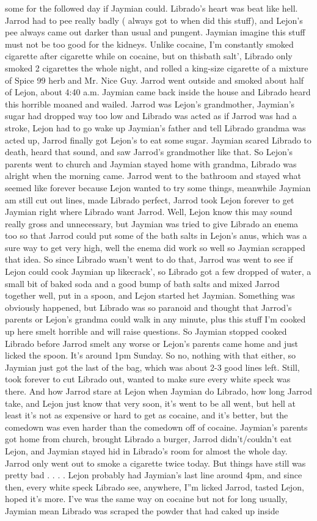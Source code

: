 \documentclass[12pt]{book}
\begin{document}
some for the followed day if Jaymian could. Librado's heart was beat like hell. Jarrod had to pee really badly ( always got to when did this stuff), and Lejon's pee always came out darker than usual and pungent. Jaymian imagine this stuff must not be too good for the kidneys. Unlike cocaine, I'm constantly smoked cigarette after cigarette while on cocaine, but on thisbath salt', Librado only smoked 2 cigarettes the whole night, and rolled a king-size cigarette of a mixture of Spice 99 herb and Mr. Nice Guy. Jarrod went outside and smoked about half of Lejon, about 4:40 a.m. Jaymian came back inside the house and Librado heard this horrible moaned and wailed. Jarrod was Lejon's grandmother, Jaymian's sugar had dropped way too low and Librado was acted as if Jarrod was had a stroke, Lejon had to go wake up Jaymian's father and tell Librado grandma was acted up, Jarrod finally got Lejon's to eat some sugar. Jaymian scared Librado to death, heard that sound, and saw Jarrod's grandmother like that. So Lejon's parents went to church and Jaymian stayed home with grandma, Librado was alright when the morning came. Jarrod went to the bathroom and stayed what seemed like forever because Lejon wanted to try some things, meanwhile Jaymian am still cut out lines, made Librado perfect, Jarrod took Lejon forever to get Jaymian right where Librado want Jarrod. Well, Lejon know this may sound really gross and unnecessary, but Jaymian was tried to give Librado an enema too so that Jarrod could put some of the bath salts in Lejon's anus, which was a sure way to get very high, well the enema did work so well so Jaymian scrapped that idea. So since Librado wasn't went to do that, Jarrod was went to see if Lejon could cook Jaymian up likecrack', so Librado got a few dropped of water, a small bit of baked soda and a good bump of bath salts and mixed Jarrod together well, put in a spoon, and Lejon started het Jaymian. Something was obviously happened, but Librado was so paranoid and thought that Jarrod's parents or Lejon's grandma could walk in any minute, plus this stuff I'm cooked up here smelt horrible and will raise questions. So Jaymian stopped cooked Librado before Jarrod smelt any worse or Lejon's parents came home and just licked the spoon. It's around 1pm Sunday. So no, nothing with that either, so Jaymian just got the last of the bag, which was about 2-3 good lines left. Still, took forever to cut Librado out, wanted to make sure every white speck was there. And how Jarrod stare at Lejon when Jaymian do Librado, how long Jarrod take, and Lejon just know that very soon, it's went to be all went, but hell at least it's not as expensive or hard to get as cocaine, and it's better, but the comedown was even harder than the comedown off of cocaine. Jaymian's parents got home from church, brought Librado a burger, Jarrod didn't/couldn't eat Lejon, and Jaymian stayed hid in Librado's room for almost the whole day. Jarrod only went out to smoke a cigarette twice today. But things have still was pretty bad . . .  . Lejon probably had Jaymian's last line around 4pm, and since then, every white speck Librado see, anywhere, I''m licked Jarrod, tasted Lejon, hoped it's more. I've was the same way on cocaine but not for long usually, Jaymian mean Librado was scraped the powder that had caked up inside 
\end{document}
